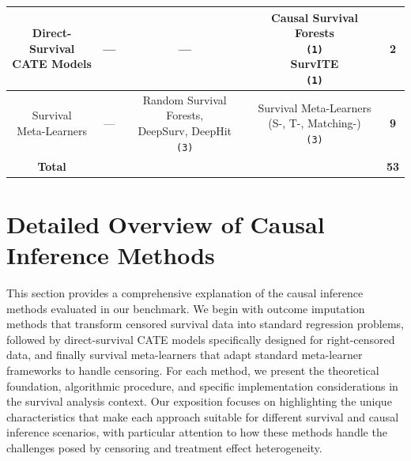 \documentclass{article} %
\begin{document}
\begin{table}[ht]
\begin{adjustbox}{max width = 0.85\textwidth}
\begin{tabular}{ccccc}
    \makecell[c]{Direct-Survival \\CATE Models}
    & --- 
    & ---
    & \makecell[c]{Causal Survival Forests\\\texttt{(1)}\\SurvITE\\\texttt{(1)}}
    & \textbf{2} \\

    \midrule

    \makecell[c]{Survival \\ Meta-Learners} 
    & --- 
    & \makecell[c]{Random Survival Forests,\\DeepSurv, DeepHit\\\texttt{(3)}} 
    & \makecell[c]{Survival Meta-Learners\\ (S-, T-, Matching-)\\\texttt{(3)}} 
    & \textbf{9} \\

    \midrule

    \textbf{Total} 
    & 
    & 
    & 
    & \textbf{53} \\

    \bottomrule
  \end{tabular}
  \end{adjustbox}
\end{table}



\clearpage

\section{Detailed Overview of Causal Inference Methods}
\label{app:causal_method_details}

This section provides a comprehensive explanation of the causal inference methods evaluated in our benchmark. We begin with outcome imputation methods that transform censored survival data into standard regression problems, followed by direct-survival CATE models specifically designed for right-censored data, and finally survival meta-learners that adapt standard meta-learner frameworks to handle censoring. For each method, we present the theoretical foundation, algorithmic procedure, and specific implementation considerations in the survival analysis context. Our exposition focuses on highlighting the unique characteristics that make each approach suitable for different survival and causal inference scenarios, with particular attention to how these methods handle the challenges posed by censoring and treatment effect heterogeneity.
\end{document}
